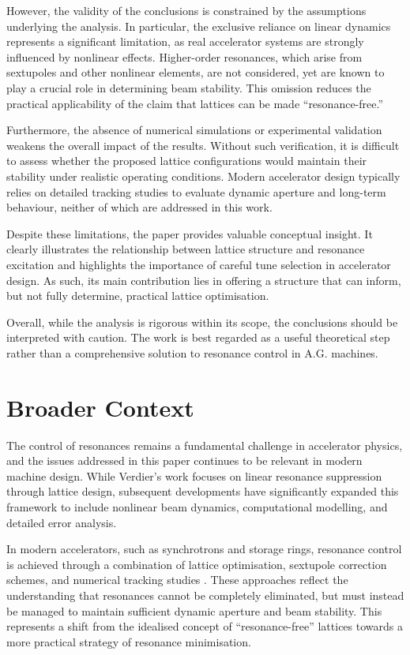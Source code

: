 \documentclass[twocolumn,10pt,a4paper]{article}
\begin{document}
However, the validity of the conclusions is constrained by the assumptions underlying the analysis. In particular, the exclusive reliance on linear dynamics represents a significant limitation, as real accelerator systems are strongly influenced by nonlinear effects. Higher-order resonances, which arise from sextupoles and other nonlinear elements, are not considered, yet are known to play a crucial role in determining beam stability. This omission reduces the practical applicability of the claim that lattices can be made ``resonance-free.''

Furthermore, the absence of numerical simulations or experimental validation weakens the overall impact of the results. Without such verification, it is difficult to assess whether the proposed lattice configurations would maintain their stability under realistic operating conditions. Modern accelerator design typically relies on detailed tracking studies to evaluate dynamic aperture and long-term behaviour, neither of which are addressed in this work.

Despite these limitations, the paper provides valuable conceptual insight. It clearly illustrates the relationship between lattice structure and resonance excitation and highlights the importance of careful tune selection in accelerator design. As such, its main contribution lies in offering a structure that can inform, but not fully determine, practical lattice optimisation.

Overall, while the analysis is rigorous within its scope, the conclusions should be interpreted with caution. The work is best regarded as a useful theoretical step rather than a comprehensive solution to resonance control in A.G. machines.

\section{Broader Context}

The control of resonances remains a fundamental challenge in accelerator physics, and the issues addressed in this paper continues to be relevant in modern machine design. While Verdier’s work focuses on linear resonance suppression through lattice design, subsequent developments have significantly expanded this framework to include nonlinear beam dynamics, computational modelling, and detailed error analysis.

In modern accelerators, such as synchrotrons and storage rings, resonance control is achieved through a combination of lattice optimisation, sextupole correction schemes, and numerical tracking studies \cite{gao2000,wan2001,superkekb2013}. These approaches reflect the understanding that resonances cannot be completely eliminated, but must instead be managed to maintain sufficient dynamic aperture and beam stability. This represents a shift from the idealised concept of ``resonance-free'' lattices towards a more practical strategy of resonance minimisation.
\end{document}
